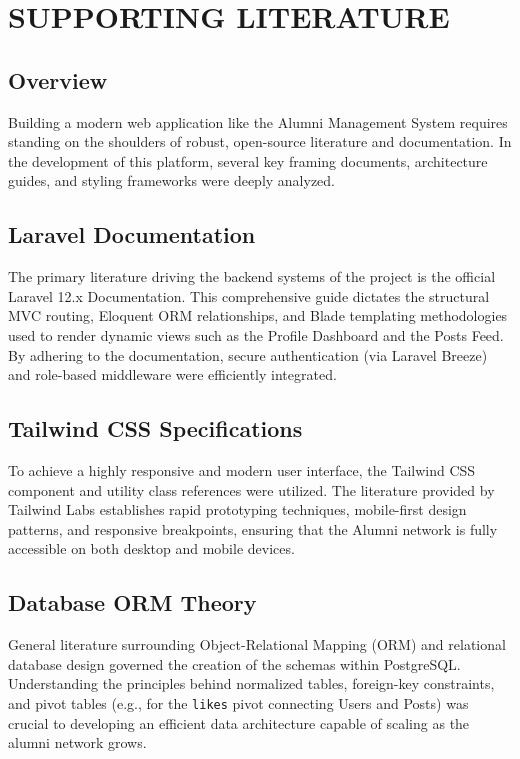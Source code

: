 \chapter{SUPPORTING LITERATURE}

\section{Overview}
Building a modern web application like the Alumni Management System requires standing on the shoulders of robust, open-source literature and documentation. In the development of this platform, several key framing documents, architecture guides, and styling frameworks were deeply analyzed.

\section{Laravel Documentation}
The primary literature driving the backend systems of the project is the official Laravel 12.x Documentation. This comprehensive guide dictates the structural MVC routing, Eloquent ORM relationships, and Blade templating methodologies used to render dynamic views such as the Profile Dashboard and the Posts Feed. By adhering to the documentation, secure authentication (via Laravel Breeze) and role-based middleware were efficiently integrated.

\section{Tailwind CSS Specifications}
To achieve a highly responsive and modern user interface, the Tailwind CSS component and utility class references were utilized. The literature provided by Tailwind Labs establishes rapid prototyping techniques, mobile-first design patterns, and responsive breakpoints, ensuring that the Alumni network is fully accessible on both desktop and mobile devices.

\section{Database ORM Theory}
General literature surrounding Object-Relational Mapping (ORM) and relational database design governed the creation of the schemas within PostgreSQL. Understanding the principles behind normalized tables, foreign-key constraints, and pivot tables (e.g., for the \texttt{likes} pivot connecting Users and Posts) was crucial to developing an efficient data architecture capable of scaling as the alumni network grows.
